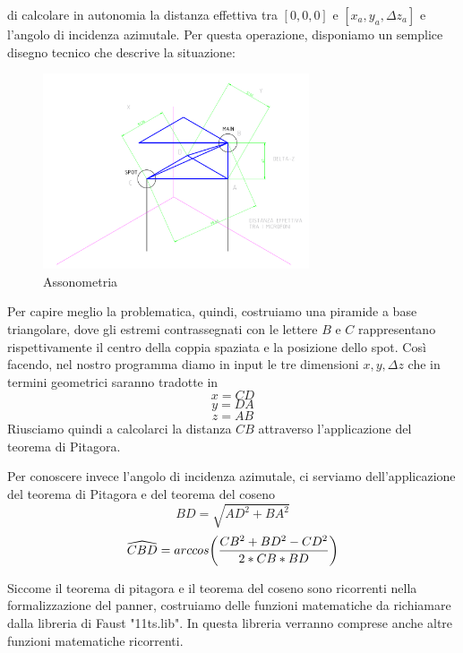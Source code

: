 \documentclass{article}
\begin{document}
    
    
    di calcolare in autonomia la distanza effettiva tra $\left[0,0,0\right]$ e $\left[x_a,y_a,\Delta z_a\right]$ e l'angolo di incidenza azimutale. Per questa operazione, disponiamo un semplice disegno tecnico che descrive la situazione:

    \begin{figure}[H]
        \centering
        \includegraphics[width=0.7\textwidth]{images/Assonometria.png}
         \caption{\label{fig1}Assonometria}
    \end{figure}

    Per capire meglio la problematica, quindi, costruiamo una piramide a base triangolare, dove gli estremi contrassegnati con le lettere $B$ e $C$ rappresentano rispettivamente il centro della coppia spaziata e la posizione dello spot. Così facendo, nel nostro programma diamo in input le tre dimensioni $x, y, \Delta z$ che in termini geometrici saranno tradotte in
    $$x = CD$$
    $$y = DA$$
    $$z = AB$$
    Riusciamo quindi a calcolarci la distanza $CB$ attraverso l'applicazione del teorema di Pitagora.
    
    
    
    Per conoscere invece l'angolo di incidenza azimutale, ci serviamo dell'applicazione del teorema di Pitagora e del teorema del coseno
    $$BD = \sqrt{AD^2 + BA ^ 2}$$
    $$\widehat{CBD} = arccos \biggl( {CB ^ 2 + BD ^ 2 - CD ^ 2\over 2 * CB * BD} \biggr)$$

    Siccome il teorema di pitagora e il teorema del coseno sono ricorrenti nella formalizzazione del panner, costruiamo delle funzioni matematiche da richiamare dalla libreria di Faust "11ts.lib". In questa libreria verranno comprese anche altre funzioni matematiche ricorrenti.
    
\end{document}

